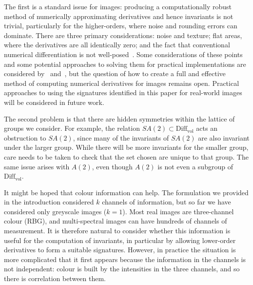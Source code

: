 \documentclass[review,onefignum,onetabnum]{siamonline190516}
\begin{document}
The first is a standard issue for images: producing a computationally robust method of numerically approximating derivatives and hence invariants is not trivial, particularly for the higher-orders, where noise and rounding errors can dominate. There are three primary considerations: noise and texture; flat areas, where the derivatives are all identically zero; and the fact that conventional numerical differentiation is not well-posed~\citep{Florack1993}. Some considerations of these points and some potential approaches to solving them for practical implementations are considered by~\citet{Calabi1998} and~\citet{Florack1993}, but the question of how to create a full and effective method of computing numerical derivatives for images remains open. Practical approaches to using the signatures identified in this paper for real-world images will be considered in future work.

The second problem is that there are hidden symmetries within the lattice of groups we consider. For example, the relation $SA(2)\subset \mathrm{Diff}_{\mathrm{vol}}$ acts an obstruction to $SA(2)$, since many of the invariants of $SA(2)$ are also invariant under the larger group. While there will be more invariants for the smaller group, care needs to be taken to check that the set chosen are unique to that group. The same issue arises with $A(2)$, even though $A(2)$ is not even a subgroup of $\mathrm{Diff}_{\mathrm{vol}}$.

It might be hoped that colour information can help. The formulation we provided in the introduction considered $k$ channels of information, but so far we have considered only greyscale images ($k=1$). Most real images are three-channel colour (RBG), and multi-spectral images can have hundreds of channels of measurement. It is therefore natural to consider whether this information is useful for the computation of invariants, in particular by allowing lower-order derivatives to form a suitable signatures. However, in practice the situation is more complicated that it first appears because the information in the channels is not independent: colour is built by the intensities in the three channels, and so there is correlation between them. %
\end{document}
